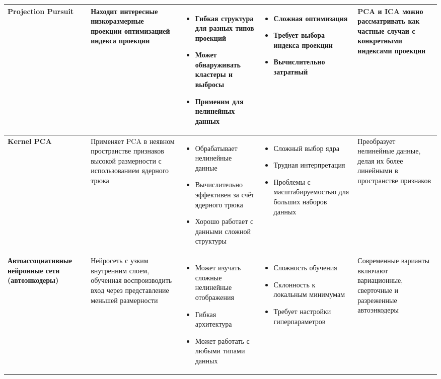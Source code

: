 \documentclass[a4paper,12pt]{article}
\begin{document}
{\begin{longtable}{|p{3.5cm}|p{3.5cm}|p{2.8cm}|p{2.8cm}|p{2.8cm}|}
\textbf{Projection Pursuit} & 
Находит интересные низкоразмерные проекции оптимизацией индекса проекции & 
\begin{itemize}[leftmargin=*]
    \item Гибкая структура для разных типов проекций
    \item Может обнаруживать кластеры и выбросы
    \item Применим для нелинейных данных
\end{itemize} & 
\begin{itemize}[leftmargin=*]
    \item Сложная оптимизация
    \item Требует выбора индекса проекции
    \item Вычислительно затратный
\end{itemize} & 
PCA и ICA можно рассматривать как частные случаи с конкретными индексами проекции \\
\hline

\textbf{Kernel PCA} & 
Применяет PCA в неявном пространстве признаков высокой размерности с использованием ядерного трюка & 
\begin{itemize}[leftmargin=*]
    \item Обрабатывает нелинейные данные
    \item Вычислительно эффективен за счёт ядерного трюка
    \item Хорошо работает с данными сложной структуры
\end{itemize} & 
\begin{itemize}[leftmargin=*]
    \item Сложный выбор ядра
    \item Трудная интерпретация
    \item Проблемы с масштабируемостью для больших наборов данных
\end{itemize} & 
Преобразует нелинейные данные, делая их более линейными в пространстве признаков \\
\hline

\textbf{Автоассоциативные нейронные сети (автоэнкодеры)} & 
Нейросеть с узким внутренним слоем, обученная воспроизводить вход через представление меньшей размерности & 
\begin{itemize}[leftmargin=*]
    \item Может изучать сложные нелинейные отображения
    \item Гибкая архитектура
    \item Может работать с любыми типами данных
\end{itemize} & 
\begin{itemize}[leftmargin=*]
    \item Сложность обучения
    \item Склонность к локальным минимумам
    \item Требует настройки гиперпараметров
\end{itemize} & 
Современные варианты включают вариационные, сверточные и разреженные автоэнкодеры \\
\hline


\end{longtable}}
\end{document}
